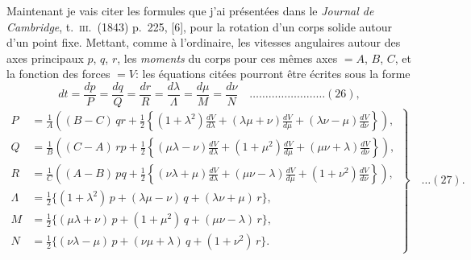 \documentclass[11pt,a4paper]{book}
\begin{document}
Maintenant je vais citer les formules que j'ai pr\'esent\'ees dans le \textit{Journal de Cambridge}, t.~\textsc{iii}.~(1843) p.~225, [6], pour la rotation d'un corps solide autour d'un point fixe. Mettant, comme \`a l'ordinaire, les vitesses angulaires autour des axes principaux $p$, $q$, $r$, les \textit{moments} du corps pour ces m\^emes axes $= A$, $B$, $C$, et la fonction des forces $= V$: les \'equations cit\'ees pourront \^etre \'ecrites sous la forme
\[
dt = \frac{dp}{P} = \frac{dq}{Q} = \frac{dr}{R} = \frac{d\lambda}{\Lambda} = \frac{d\mu}{M} = \frac{d\nu}{N} \quad \ldots \ldots \ldots \ldots \ldots \ldots \ldots \ldots (26),
\]
\[
\left. \begin{aligned}
P &= \frac{1}{A}\left((B - C)\,qr + \tfrac{1}{2}\left\{(1 + \lambda^2)\frac{dV}{d\lambda} + (\lambda\mu + \nu)\frac{dV}{d\mu} + (\lambda\nu - \mu)\frac{dV}{d\nu}\right\}\right), \\
Q &= \frac{1}{B}\left((C - A)\,rp + \tfrac{1}{2}\left\{(\mu\lambda - \nu)\frac{dV}{d\lambda} + (1 + \mu^2)\frac{dV}{d\mu} + (\mu\nu + \lambda)\frac{dV}{d\nu}\right\}\right), \\
R &= \frac{1}{C}\left((A - B)\,pq + \tfrac{1}{2}\left\{(\nu\lambda + \mu)\frac{dV}{d\lambda} + (\mu\nu - \lambda)\frac{dV}{d\mu} + (1 + \nu^2)\frac{dV}{d\nu}\right\}\right), \\
\Lambda &= \tfrac{1}{2}\{(1 + \lambda^2)\,p + (\lambda\mu - \nu)\,q + (\lambda\nu + \mu)\,r\}, \\
M &= \tfrac{1}{2}\{(\mu\lambda + \nu)\,p + (1 + \mu^2)\,q + (\mu\nu - \lambda)\,r\}, \\
N &= \tfrac{1}{2}\{(\nu\lambda - \mu)\,p + (\nu\mu + \lambda)\,q + (1 + \nu^2)\,r\}.
\end{aligned} \right\} \quad \ldots (27).
\]
\end{document}
